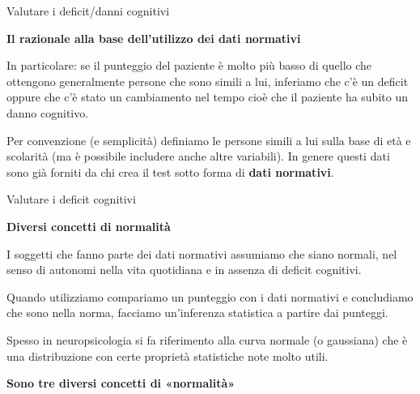 \documentclass[
  ignorenonframetext,
]{beamer}
\begin{document}
\begin{frame}{Valutare i deficit/danni cognitivi}
\label{valutare-i-deficitdanni-cognitivi-5}
\begin{center}
  \textbf{Il razionale alla base dell’utilizzo dei dati normativi}
\end{center}

In particolare: se il punteggio del paziente è molto più basso di quello
che ottengono generalmente persone che sono simili a lui, inferiamo che
c'è un deficit oppure che c'è stato un cambiamento nel tempo cioè che il
paziente ha subito un danno cognitivo.

Per convenzione (e semplicità) definiamo le persone simili a lui sulla
base di età e scolarità (ma è possibile includere anche altre
variabili). In genere questi dati sono già forniti da chi crea il test
sotto forma di \textbf{dati normativi}.
\end{frame}

\begin{frame}{Valutare i deficit cognitivi}
\label{valutare-i-deficit-cognitivi-6}
\begin{center}
  \textbf{Diversi concetti di normalità}
\end{center}

I soggetti che fanno parte dei dati normativi assumiamo che siano
normali, nel senso di autonomi nella vita quotidiana e in assenza di
deficit cognitivi.

Quando utilizziamo compariamo un punteggio con i dati normativi e
concludiamo che sono nella norma, facciamo un'inferenza statistica a
partire dai punteggi.

Spesso in neuropsicologia si fa riferimento alla curva normale (o
gaussiana) che è una distribuzione con certe proprietà statistiche note
molto utili.

\begin{center}
  \textbf{Sono tre diversi concetti di «normalità»}
\end{center}
\end{frame}
\end{document}
